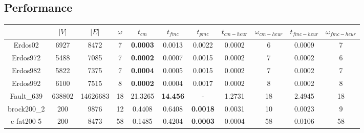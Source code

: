 \documentclass[12pt]{article}
\begin{document}
\clearpage
\nocite{python}
\nocite{numpy}
\nocite{pybind11}
\nocite{eigen2014}
\nocite{openmp1998}
\nocite{opencv}

\printbibliography

\newpage

\begin{appendix}
	\pagestyle{empty}
	\renewcommand{\arraystretch}{2.0}

	\section{Performance}%
	\label{sec:performance}
	\begin{table}[htb]
		\centering
		\begin{tabular}{|c|c|c|c|c|c|c|c|c|c|c|}
			\toprule
			                 & $|V|$   & $|E|$    & $\omega$ & $t_{cm}$         & $t_{fmc}$       & $t_{pmc}$       & $t_{cm-heur}$ & $\omega_{cm-heur}$ & $t_{fmc-heur}$ & $\omega_{fmc-heur}$ \\
			\midrule
			Erdos02          & 6927    & 8472     & 7        & \textbf{0.0003}  & 0.0013          & 0.0022          & 0.0002        & 6                  & 0.0009         & 7                   \\
			Erdos972         & 5488    & 7085     & 7        & \textbf{0.0002}  & 0.0007          & 0.0015          & 0.0002        & 7                  & 0.0002         & 6                   \\
			Erdos982         & 5822    & 7375     & 7        & \textbf{0.0004}  & 0.0005          & 0.0015          & 0.0002        & 7                  & 0.0002         & 7                   \\
			Erdos992         & 6100    & 7515     & 8        & \textbf{0.0002}  & 0.0004          & 0.0017          & 0.0002        & 8                  & 0.0002         & 8                   \\
			Fault\_639       & 638802  & 14626683 & 18       & 21.3265          & \textbf{14.456} & -               & 1.2731        & 18                 & 2.4945         & 18                  \\
			brock200\_2      & 200     & 9876     & 12       & 0.4408           & 0.6408          & \textbf{0.0018} & 0.0031        & 10                 & 0.0023         & 9                   \\
			c-fat200-5       & 200     & 8473     & 58       & 0.1485           & 0.4204          & \textbf{0.0003} & 0.0004        & 58                 & 0.0106         & 58                  \\

\end{tabular}
\end{table}
\end{appendix}
\end{document}
